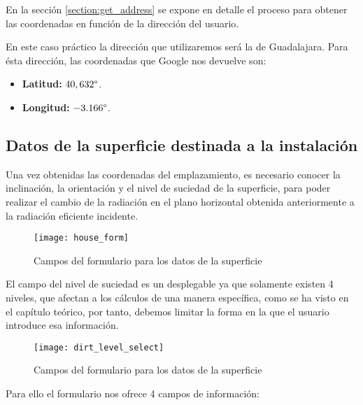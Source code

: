 En la sección \ref{section:get_address} se expone en detalle el proceso para obtener las coordenadas en función de la dirección del usuario.

En este caso práctico la dirección que utilizaremos será la de Guadalajara. Para ésta dirección, las coordenadas que Google nos devuelve son:
\begin{itemize}
\item \textbf{Latitud:} $40,632 \degree$.
\item \textbf{Longitud:} $-3.166 \degree$.
\end{itemize}

\subsection{Datos de la superficie destinada a la instalación}

Una vez obtenidas las coordenadas del emplazamiento, es necesario conocer la inclinación, la orientación y el nivel de suciedad de la superficie, para poder realizar el cambio de la radiación en el plano horizontal obtenida anteriormente a la radiación eficiente incidente.

\begin{figure}[ht]
\texttt{[image: house\_form]}
\centering
\caption{Campos del formulario para los datos de la superficie}
\label{fig:house_form}
\end{figure}

\newpage

El campo del nivel de suciedad es un desplegable ya que solamente existen 4 niveles, que afectan a los cálculos de una manera específica, como se ha visto en el capítulo teórico, por tanto, debemos limitar la forma en la que el usuario introduce esa información.

\begin{figure}[ht]
\texttt{[image: dirt\_level\_select]}
\centering
\caption{Campos del formulario para los datos de la superficie}
\label{fig:dirt_level_input}
\end{figure}


Para ello el formulario nos ofrece 4 campos de información:

